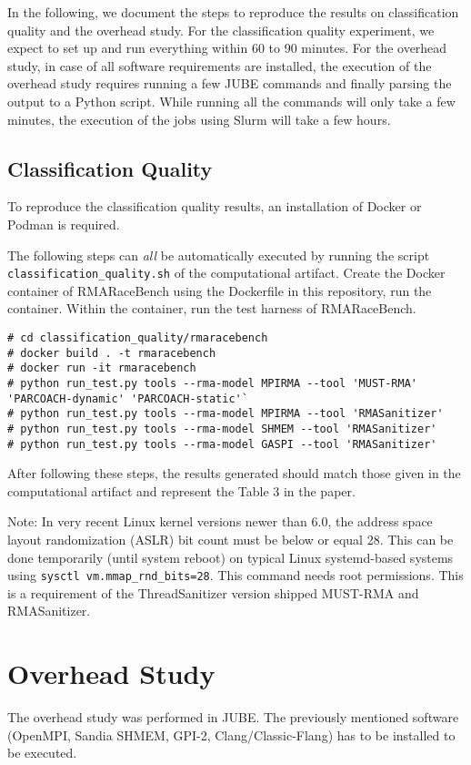 \documentclass[twoside]{article}
\begin{document}
In the following, we document the steps to reproduce the results on classification quality and the overhead study.
For the classification quality experiment, we expect to set up and run everything within 60 to 90 minutes.
For the overhead study, in case of all software requirements are installed, the execution of the overhead study requires running a few JUBE commands and finally parsing the output to a Python script. While running all the commands will only take a few minutes, the execution of the jobs using Slurm will take a few hours.

\subsection*{Classification Quality}
To reproduce the classification quality results, an installation of Docker or Podman is required.

The following steps can \textit{all} be automatically executed by running the script \texttt{classification\_quality.sh} of the computational artifact.
Create the Docker container of RMARaceBench using the Dockerfile in this repository, run the container. Within the container, run the test harness of RMARaceBench.
{
\small
\begin{verbatim}
# cd classification_quality/rmaracebench
# docker build . -t rmaracebench
# docker run -it rmaracebench
# python run_test.py tools --rma-model MPIRMA --tool 'MUST-RMA' 'PARCOACH-dynamic' 'PARCOACH-static'`
# python run_test.py tools --rma-model MPIRMA --tool 'RMASanitizer'
# python run_test.py tools --rma-model SHMEM --tool 'RMASanitizer'
# python run_test.py tools --rma-model GASPI --tool 'RMASanitizer'
\end{verbatim}
}

After following these steps, the results generated should match those given in the computational artifact and represent the Table 3 in the paper.

Note: In very recent Linux kernel versions newer than 6.0, the address space layout randomization (ASLR) bit count must be below or equal 28. This can be done temporarily (until system reboot) on typical Linux systemd-based systems using \texttt{sysctl vm.mmap\_rnd\_bits=28}. This command needs root permissions. This is a requirement of the ThreadSanitizer version shipped MUST-RMA and RMASanitizer.


\section*{Overhead Study}
The overhead study was performed in JUBE. The previously mentioned software (OpenMPI, Sandia SHMEM, GPI-2, Clang/Classic-Flang) has to be installed to be executed.
\end{document}
